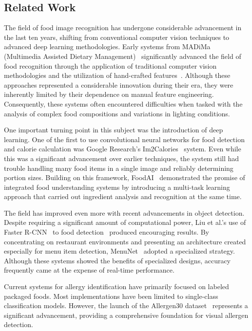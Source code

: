 \documentclass[10pt,twocolumn,letterpaper]{article}
\begin{document}
\subsection{Related Work}

The field of food image recognition has undergone considerable advancement in the last ten years, shifting from conventional computer vision techniques to advanced deep learning methodologies. 
Early systems from MADiMa (Multimedia Assisted Dietary Management)~\cite{madima2017} significantly advanced the field of food recognition through the application of traditional computer vision methodologies and the utilization of hand-crafted features~\cite{hand_crafted}. 
Although these approaches represented a considerable innovation during their era, they were inherently limited by their dependence on manual feature engineering. 
Consequently, these systems often encountered difficulties when tasked with the analysis of complex food compositions and variations in lighting conditions.

One important turning point in this subject was the introduction of deep learning. 
One of the first to use convolutional neural networks for food detection and calorie calculation was Google Research's Im2Calories~\cite{im2calories} system. 
Even while this was a significant advancement over earlier techniques, the system still had trouble handling many food items in a single image and reliably determining portion sizes. 
Building on this framework, FoodAI~\cite{foodai2024} demonstrated the promise of integrated food understanding systems by introducing a multi-task learning approach that carried out ingredient analysis and recognition at the same time.

The field has improved even more with recent advancements in object detection. Despite requiring a significant amount of computational power, Liu et al.'s use of Faster R-CNN~\cite{fasterrcnn} to food detection~\cite{food_rcnn} produced encouraging results. 
By concentrating on restaurant environments and presenting an architecture created especially for menu item detection, MenuNet~\cite{menunet} adopted a specialized strategy. 
Although these systems showed the benefits of specialized designs, accuracy frequently came at the expense of real-time performance.

Current systems for allergy identification have primarily focused on labeled packaged foods. 
Most implementations have been limited to single-class classification models. 
However, the launch of the Allergen30 dataset~\cite{mishra2022allergen30} represents a significant advancement, providing a comprehensive foundation for visual allergen detection.
\end{document}

